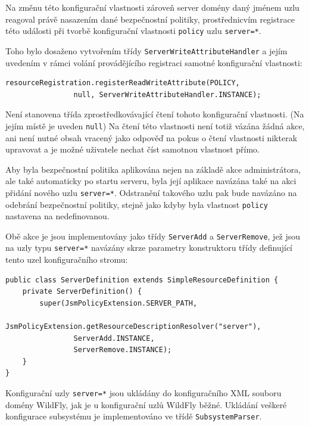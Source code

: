 Na změnu této konfigurační vlastnosti zároveň server domény daný jménem uzlu reagoval právě nasazením dané bezpečnostní politiky, prostřednicvím registrace této události při tvorbě konfigurační vlastnosti {\tt policy} uzlu {\tt server=*}.

Toho bylo dosaženo vytvořením třídy {\tt ServerWriteAttributeHandler} a jejím uvedením v rámci volání provádějícího registraci samotné konfigurační vlastnosti:

\begin{lstlisting}[caption=Registrace konfigurační vlastnosti {\tt policy} uzlu {\tt server=*}, label=registraceAtributu]
resourceRegistration.registerReadWriteAttribute(POLICY,
                null, ServerWriteAttributeHandler.INSTANCE);
\end{lstlisting}

Není stanovena třída zprostředkovávající čtení tohoto konfigurační vlastnosti. (Na jejím místě je uveden {\tt null}) Na čtení této vlastnosti není totiž vázána žádná akce, ani není nutné obsah vracený jako odpověď na pokus o čtení vlastnosti nikterak upravovat a je možné uživatele nechat číst samotnou vlastnost přímo.

Aby byla bezpečnostní politika aplikována nejen na základě akce administrátora, ale také automaticky po startu serveru, byla její aplikace navázána také na akci přidání nového uzlu {\tt server=*}. Odstranění takového uzlu pak bude navázáno na odebrání bezpečnostní politiky, stejně jako kdyby byla vlastnost {\tt policy} nastavena na nedefinovanou.

Obě akce je jsou implementovány jako třídy {\tt ServerAdd} a {\tt ServerRemove}, jež jsou na uzly typu {\tt server=*} navázány skrze parametry konstruktoru třídy definující tento uzel konfiguračního stromu:

\begin{lstlisting}[caption=Definice konfiguračního uzlu {\tt server=*}, label=registraceUzluServer]
public class ServerDefinition extends SimpleResourceDefinition {
    private ServerDefinition() {
        super(JsmPolicyExtension.SERVER_PATH,
                JsmPolicyExtension.getResourceDescriptionResolver("server"),
                ServerAdd.INSTANCE,
                ServerRemove.INSTANCE);
    }
}
\end{lstlisting}

Konfigurační uzly {\tt server=*} jsou ukládány do konfiguračního XML souboru domény WildFly, jak je u konfigurační uzlů WildFly běžné. Ukládání veškeré konfigurace subsystému je implementováno ve třídě {\tt SubsystemParser}.

